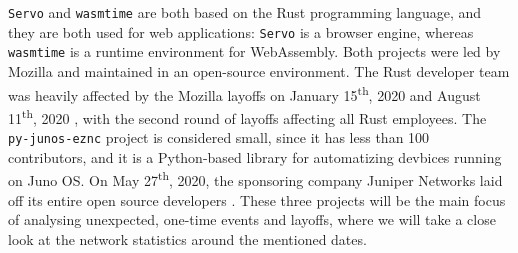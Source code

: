 \begin{table}
    \centering
        \caption{Collaboration analysis projects and basic statistics.}
        \label{tab:projects}
\end{table}

\texttt{Servo} and \texttt{wasmtime} are both based on the Rust programming language, and they are both used for web applications: \texttt{Servo} is a browser engine, whereas \texttt{wasmtime} is a runtime environment for WebAssembly. Both projects were led by Mozilla and maintained in an open-source environment. The Rust developer team was heavily affected by the Mozilla layoffs on January 15\textsuperscript{th}, 2020 and August 11\textsuperscript{th}, 2020 \cite{lardinoisMozillaLays70,kastrenakesMozillaLaying2502020}, with the second round of layoffs affecting all Rust employees. The \texttt{py-junos-eznc} project is considered small, since it has less than 100 contributors, and it is a Python-based library for automatizing devbices running on Juno OS. On May 27\textsuperscript{th}, 2020, the sponsoring company Juniper Networks laid off its entire open source developers \cite{brasseurFarewellJuniperNetworks2020}. These three projects will be the main focus of analysing unexpected, one-time events and layoffs, where we will take a close look at the network statistics around the mentioned dates.

